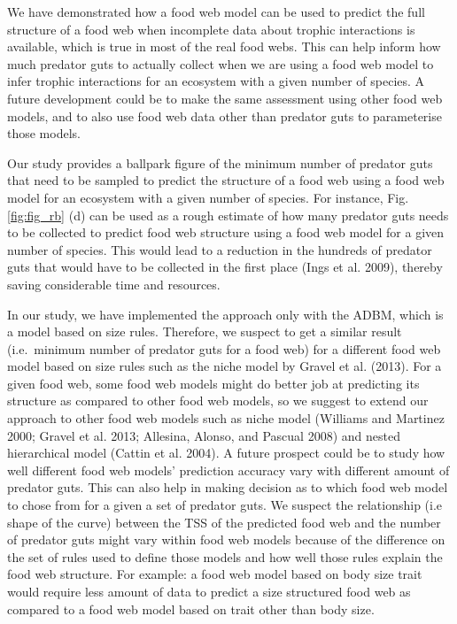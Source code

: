 \documentclass{article}
\begin{document}
We have demonstrated how a food web model can be used to predict the
full structure of a food web when incomplete data about trophic
interactions is available, which is true in most of the real food webs.
This can help inform how much predator guts to actually collect when we
are using a food web model to infer trophic interactions for an
ecosystem with a given number of species. A future development could be
to make the same assessment using other food web models, and to also use
food web data other than predator guts to parameterise those models.

Our study provides a ballpark figure of the minimum number of predator
guts that need to be sampled to predict the structure of a food web
using a food web model for an ecosystem with a given number of species.
For instance, Fig. \ref{fig:fig_rb} (d) can be used as a rough estimate
of how many predator guts needs to be collected to predict food web
structure using a food web model for a given number of species. This
would lead to a reduction in the hundreds of predator guts that would
have to be collected in the first place (Ings et al. 2009), thereby
saving considerable time and resources.

In our study, we have implemented the approach only with the ADBM, which
is a model based on size rules. Therefore, we suspect to get a similar
result (i.e.~minimum number of predator guts for a food web) for a
different food web model based on size rules such as the niche model by
Gravel et al. (2013). For a given food web, some food web models might
do better job at predicting its structure as compared to other food web
models, so we suggest to extend our approach to other food web models
such as niche model (Williams and Martinez 2000; Gravel et al. 2013;
Allesina, Alonso, and Pascual 2008) and nested hierarchical model
(Cattin et al. 2004). A future prospect could be to study how well
different food web models' prediction accuracy vary with different
amount of predator guts. This can also help in making decision as to
which food web model to chose from for a given a set of predator guts.
We suspect the relationship (i.e shape of the curve) between the TSS of
the predicted food web and the number of predator guts might vary within
food web models because of the difference on the set of rules used to
define those models and how well those rules explain the food web
structure. For example: a food web model based on body size trait would
require less amount of data to predict a size structured food web as
compared to a food web model based on trait other than body size.
\end{document}
